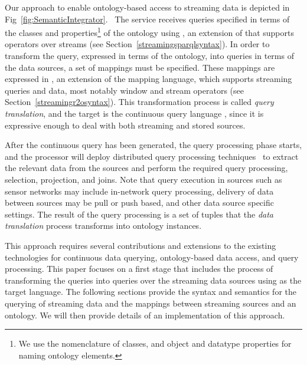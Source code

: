 Our approach to enable ontology-based access to streaming data is depicted in Fig~\ref{fig:SemanticIntegrator}.\ %
The service receives queries specified in terms of the classes and properties\footnote{We use the \owl nomenclature of classes, and object and datatype properties for naming ontology elements.} of the ontology using \sparqlstr, an extension of \sparql that supports operators over \rdf streams (see Section~\ref{streamingsparqlsyntax}). 
In order to transform the \sparqlstr query, expressed in terms of the ontology, into queries in terms of the data sources, a set of mappings must be specified. 
These mappings are expressed in \stwoo, an extension of the \rtwoo mapping language, which supports streaming queries and data, most notably window and stream operators (see Section~\ref{streamingr2osyntax}). 
This transformation process is called \textit{query translation}, and the target is the continuous query language \sneeql, since it is expressive enough to deal with both streaming and stored sources.

After the continuous query has been generated, the query processing phase starts, and the processor will deploy distributed query processing techniques~\cite{Kossmann_00} to extract the relevant data from the sources and perform the required query processing, \eg selection, projection, and joins. %
%
Note that query execution in sources such as sensor networks may include in-network query processing, delivery of data between sources may be pull or push based, and other data source specific settings. The result of the query processing is a set of tuples that the \textit{data translation} process transforms into ontology instances.

This approach requires several contributions and extensions to the existing technologies for continuous data querying, ontology-based data access, and \sparql query processing. 
This paper focuses on a first stage that includes the process of transforming the \sparqlstr queries into queries over the streaming data sources using \sneeql as the target language.
The following sections provide the syntax and semantics for the querying of streaming \rdf data and the mappings between streaming sources and an ontology.
We will then provide details of an implementation of this approach.

